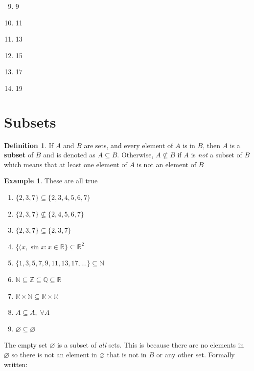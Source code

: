 \documentclass[10pt]{article}
\newcommand{\R}{\mathbb{R}}
\newcommand{\N}{\mathbb{N}}
\newcommand{\Z}{\mathbb{Z}}
\newcommand{\Q}{\mathbb{Q}}
\theoremstyle{definition}
\newtheorem{example}{Example}
\newtheorem{definition}{Definition}
\begin{document}
\begin{enumerate}[label=\Alph*.]
\begin{enumerate}[label=\arabic*.]
                \setcounter{enumii}{8}
            \item 9
            \item 11
            \item 13
            \item 15
            \item 17
            \item 19
        \end{enumerate}
\end{enumerate}

\section{Subsets}
\begin{definition}
    If $A$ and $B$ are sets, and every element of $A$ is in $B$, then $A$ is a \textbf{subset} of $B$ and is denoted as $A \subseteq B$. Otherwise, $A \not\subseteq B$ if $A$ is \textit{not} a subset of $B$ which means that at least one element of $A$ is not an element of $B$
\end{definition}

\begin{example} These are all true
    \begin{enumerate}
        \item $\{2,3,7\} \subseteq \{2,3,4,5,6,7\}$
        \item $\{2,3,7\} \not\subseteq \{2,4,5,6,7\}$
        \item $\{2,3,7\} \subseteq \{2,3,7\}$
        \item $\{(x,\sin{x}: x\in\R\} \subseteq \R^2$
        \item $\{1,3,5,7,9,11,13,17,\dots\} \subseteq \N$
        \item $\N \subseteq \Z \subseteq \Q \subseteq \R$
        \item $\R \times \N \subseteq \R \times \R$
        \item $A \subseteq A, \; \forall A$
        \item $\varnothing \subseteq \varnothing$
    \end{enumerate}
\end{example}

The empty set $\varnothing$ is a subset of \textit{all} sets. This is because there are no elements in $\varnothing$ so there is not an element in $\varnothing$ that is not in $B$ or any other set. Formally written:
\end{document}
